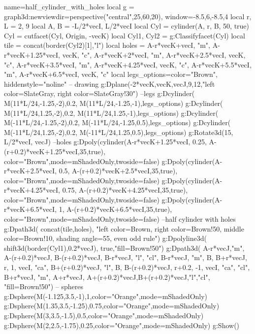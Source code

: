 \documentclass{standalone}
\begin{document}
\begin{luadraw}{name=half_cylinder_with_holes}
local g = graph3d:new{viewdir=perspective("central",25,60,20), window={-8.5,6,-8.5,4}}
local r, L = 2, 9
local A, B = -L/2*vecI, L/2*vecI
local Cyl = cylinder(A, r, B, 50, true)
Cyl = cutfacet(Cyl, {Origin, -vecK})
local Cyl1, Cyl2 = g:Classifyfacet(Cyl)
local tile = concat(border(Cyl2)[1],{"l"})
local holes = {A-r*vecK+vecI, "m", A-r*vecK+1.25*vecI, vecK, "c", A-r*vecK+2*vecI, "m", A-r*vecK+2.5*vecI, vecK, "c", A-r*vecK+3.5*vecI, "m", A-r*vecK+4.25*vecI, vecK, "c", A-r*vecK+5.5*vecI, "m", A-r*vecK+6.5*vecI, vecK, "c"}
local legs_options={color="Brown", hiddenstyle="noline"}
-- drawing
g:Dplane({-2*vecK,vecK},vecJ,9,12,"left color=SlateGray, right color=SlateGray!30")
--legs
g:Dcylinder( M(11*L/24,-1.25,-2),0.2, M(11*L/24,-1.25,-1),legs_options)
g:Dcylinder( M(11*L/24,1.25,-2),0.2, M(11*L/24,1.25,-1),legs_options)
g:Dcylinder( M(-11*L/24,-1.25,-2),0.2, M(-11*L/24,-1.25,0.5),legs_options)
g:Dcylinder( M(-11*L/24,1.25,-2),0.2, M(-11*L/24,1.25,0.5),legs_options)
g:Rotate3d(15, {L/2*vecI, vecJ})
--holes
g:Dpoly(cylinder(A-r*vecK+1.25*vecI, 0.25,  A-(r+0.2)*vecK+1.25*vecI,35,true), {color="Brown",mode=mShadedOnly,twoside=false})
g:Dpoly(cylinder(A-r*vecK+2.5*vecI, 0.5,  A-(r+0.2)*vecK+2.5*vecI,35,true), {color="Brown",mode=mShadedOnly,twoside=false})
g:Dpoly(cylinder(A-r*vecK+4.25*vecI, 0.75,  A-(r+0.2)*vecK+4.25*vecI,35,true), {color="Brown",mode=mShadedOnly,twoside=false})
g:Dpoly(cylinder(A-r*vecK+6.5*vecI, 1,  A-(r+0.2)*vecK+6.5*vecI,35,true), {color="Brown",mode=mShadedOnly,twoside=false})
--half cylinder with holes
g:Dpath3d( concat(tile,holes), "left color=Brown, right color=Brown!50, middle color=Brown!10, shading angle=55, even odd rule")
g:Dpolyline3d( shift3d(border(Cyl1),0.2*vecJ), true,"fill=Brown!50")
g:Dpath3d( {A-r*vecJ,"m", A-(r+0.2)*vecJ, B-(r+0.2)*vecJ, B-r*vecJ, "l", "cl", B-r*vecJ, "m", B, B+r*vecJ, r, 1, vecI, "ca", B+(r+0.2)*vecJ, "l", B, B-(r+0.2)*vecJ, r+0.2, -1, vecI, "ca", "cl", B+r*vecJ, "m", A+r*vecJ, A+(r+0.2)*vecJ,B+(r+0.2)*vecJ,"l","cl"}, "fill=Brown!50")
-- spheres
g:Dsphere(M(-1.125,3.5,-1),1,{color="Orange",mode=mShadedOnly})
g:Dsphere(M(1.35,3.5,-1.25),0.75,{color="Orange",mode=mShadedOnly})
g:Dsphere(M(3,3.5,-1.5),0.5,{color="Orange",mode=mShadedOnly})
g:Dsphere(M(2,2.5,-1.75),0.25,{color="Orange",mode=mShadedOnly})
g:Show()
\end{luadraw}   
\end{document}
